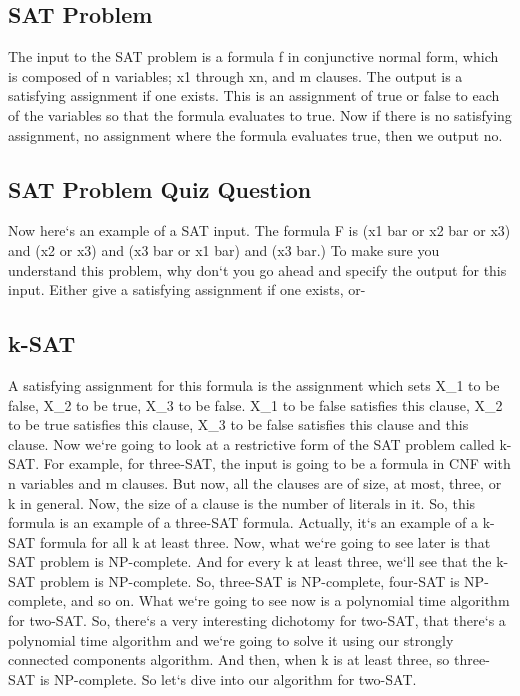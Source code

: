 \subsection{SAT Problem}
The input to the SAT problem is a formula f in conjunctive normal form, which is composed of n variables; x1 through xn, and m clauses.
The output is a satisfying assignment if one exists.
This is an assignment of true or false to each of the variables so that the formula evaluates to true.
Now if there is no satisfying assignment, no assignment where the formula evaluates true, then we output no.

\subsection{SAT Problem Quiz Question}
Now here`s an example of a SAT input.
The formula F is (x1 bar or x2 bar or x3) and (x2 or x3) and (x3 bar or x1 bar) and (x3 bar.) To make sure you understand this problem, why don`t you go ahead and specify the output for this input.
Either give a satisfying assignment if one exists, or-

\subsection{k-SAT}
A satisfying assignment for this formula is the assignment which sets X\_1 to be false, X\_2 to be true, X\_3 to be false.
X\_1 to be false satisfies this clause, X\_2 to be true satisfies this clause, X\_3 to be false satisfies this clause and this clause.
Now we`re going to look at a restrictive form of the SAT problem called k-SAT\@.
For example, for three-SAT, the input is going to be a formula in CNF with n variables and m clauses.
But now, all the clauses are of size, at most, three, or k in general.
Now, the size of a clause is the number of literals in it.
So, this formula is an example of a three-SAT formula.
Actually, it`s an example of a k-SAT formula for all k at least three.
Now, what we`re going to see later is that SAT problem is NP-complete.
And for every k at least three, we`ll see that the k-SAT problem is NP-complete.
So, three-SAT is NP-complete, four-SAT is NP-complete, and so on.
What we`re going to see now is a polynomial time algorithm for two-SAT\@.
So, there`s a very interesting dichotomy for two-SAT, that there`s a polynomial time algorithm and we`re going to solve it using our strongly connected components algorithm.
And then, when k is at least three, so three-SAT is NP-complete.
So let`s dive into our algorithm for two-SAT\@.

